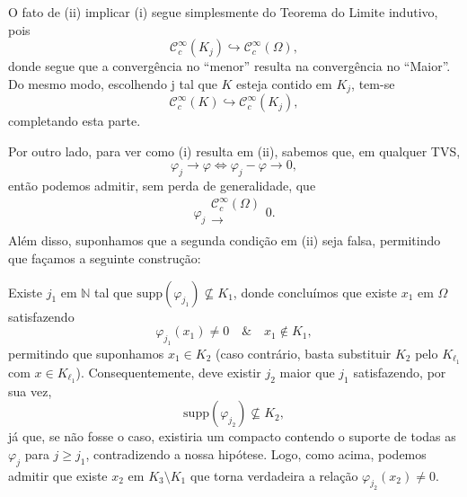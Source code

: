 \documentclass[../distribution_theory_notes.tex]{subfiles}
\begin{document}
   \begin{proof*}
     O fato de (ii) implicar (i) segue simplesmente  do Teorema do Limite indutivo, pois 
       \[
         \mathcal{C}_{c}^{\infty}(K_{j})\hookrightarrow \mathcal{C}_{c}^{\infty}(\Omega ),
       \]
       donde segue que a convergência no ``menor'' resulta na convergência no ``Maior''. Do mesmo modo, escolhendo j tal que \(K\) esteja contido em \(K_{j}\), tem-se 
         \[
           \mathcal{C}_{c}^{\infty}(K)\hookrightarrow \mathcal{C}_{c}^{\infty}(K_{j}),
         \]
         completando esta parte. 

         Por outro lado, para ver como (i) resulta em (ii), sabemos que, em qualquer TVS, 
           \[
             \varphi_{j}\rightarrow \varphi  \Longleftrightarrow \varphi_{j}-\varphi \rightarrow 0,
           \]
           então podemos admitir, sem perda de generalidade, que 
             \[
               \varphi_{j}\substack{\mathcal{C}_{c}^{\infty}(\Omega ) \\ \longrightarrow \\ }0.
             \]
             Além disso, suponhamos que a segunda condição em (ii) seja falsa, permitindo que façamos a seguinte construção: 

             Existe \(j_1\) em \(\mathbb{N}\) tal que \(\mathrm{supp}(\varphi_{j_1})\not\subseteq K_1\), donde concluímos que existe \(x_1\) em \(\Omega \) satisfazendo 
               \[
                 \varphi_{j_1}(x_1)\neq 0 \quad\&\quad x_1\not\in K_1,
               \]
               permitindo que suponhamos \(x_1\in K_2\) (caso contrário, basta substituir \(K_2\) pelo \(K_{\ell_1}\) com \(x\in K_{\ell_1}\)). Consequentemente, deve existir \(j_2\) maior que \(j_1\) satisfazendo, por sua vez, 
                 \[
                   \mathrm{supp}(\varphi_{j_2})\not\subseteq K_2,
                 \]
                 já que, se não fosse o caso, existiria um compacto contendo o suporte de todas as \(\varphi_{j}\) para \(j\geq j_1\), contradizendo a nossa hipótese. Logo, como acima, podemos admitir que existe \(x_2\) em \(K_3\setminus{K_1}\) que torna verdadeira a relação \(\varphi_{j_2}(x_2)\neq 0\). 


\end{proof*}
\end{document}
